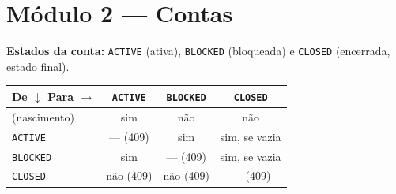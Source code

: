 \documentclass[11pt,a4paper]{article}
\newcommand{\tb}[1]{\texttt{#1}}           %
\begin{document}
\section{Módulo 2 --- Contas}

\textbf{Estados da conta:} \tb{ACTIVE} (ativa), \tb{BLOCKED} (bloqueada) e \tb{CLOSED}
(encerrada, estado final).

\begin{center}
\begin{tabular}{@{}lccc@{}}
\toprule
\textbf{De $\downarrow$ \quad Para $\to$} & \tb{ACTIVE} & \tb{BLOCKED} & \tb{CLOSED} \\
\midrule
(nascimento) & sim & não & não \\
\tb{ACTIVE}  & --- (409) & sim & sim, se vazia \\
\tb{BLOCKED} & sim & --- (409) & sim, se vazia \\
\tb{CLOSED}  & não (409) & não (409) & --- (409) \\
\bottomrule
\end{tabular}
\end{center}
\end{document}
